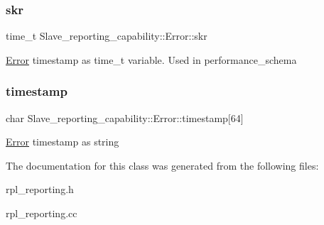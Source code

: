 \subsubsection{\texorpdfstring{skr}{skr}}
{\footnotesize\ttfamily time\+\_\+t Slave\+\_\+reporting\+\_\+capability\+::\+Error\+::skr}

\mbox{\hyperlink{classSlave__reporting__capability_1_1Error}{Error}} timestamp as time\+\_\+t variable. Used in performance\+\_\+schema \mbox{\label{classSlave__reporting__capability_1_1Error_a591736bef68a00d3898d1b6e232a2158}} 
\subsubsection{\texorpdfstring{timestamp}{timestamp}}
{\footnotesize\ttfamily char Slave\+\_\+reporting\+\_\+capability\+::\+Error\+::timestamp\mbox{[}64\mbox{]}}

\mbox{\hyperlink{classSlave__reporting__capability_1_1Error}{Error}} timestamp as string 

The documentation for this class was generated from the following files\+:\begin{DoxyCompactItemize}
\item 
rpl\+\_\+reporting.\+h\item 
rpl\+\_\+reporting.\+cc\end{DoxyCompactItemize}
